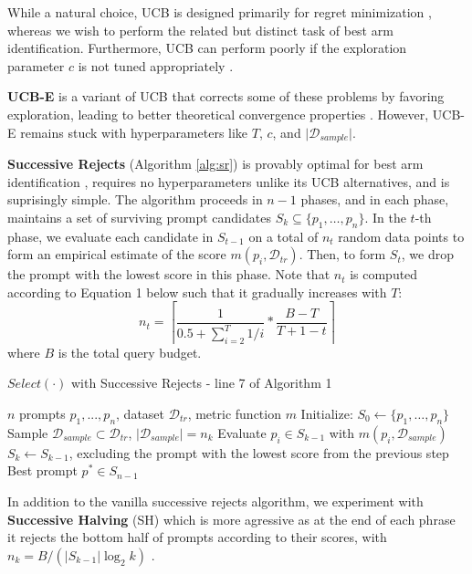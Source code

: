 While a natural choice, UCB is designed primarily for regret minimization \cite{kuleshov2014algorithms}, whereas we wish to perform the related but distinct task of best arm identification. Furthermore, UCB can perform poorly if the exploration parameter $c$ is not tuned appropriately \cite{bubeck2012regret}. 

\textbf{UCB-E} is a variant of UCB that corrects some of these problems by favoring exploration, leading to better theoretical convergence properties \cite{audibert2010best}. However, UCB-E remains stuck with hyperparameters like $T$, $c$, and $\vert \mathcal{D}_{sample}\vert$.

\textbf{Successive Rejects} (Algorithm \ref{alg:sr}) is provably optimal for best arm identification \citep{audibert2010best}, requires no hyperparameters unlike its UCB alternatives, and is suprisingly simple. The algorithm proceeds in $n - 1$ phases, and in each phase, maintains a set of surviving prompt candidates $S_k \subseteq \{p_1, \ldots, p_n\}$.
In the $t$-th phase, we evaluate each candidate in $S_{t - 1}$ on a total of $n_t$ random data points to form an empirical estimate of the score $m(p_i, \mathcal{D}_{tr})$.
Then, to form $S_t$, we drop the prompt with the lowest score in this phase.
Note that $n_t$ is computed according to Equation 1 below such that it gradually increases with $T$:
\begin{equation}
    n_t = \left \lceil{\frac{1}{0.5 + \sum_{i=2}^{T} 1 / i} * \frac{B - T}{T + 1 - t}}\right \rceil 
\end{equation}
where $B$ is the total query budget.

\begin{algorithm}
\caption{$Select(\cdot)$ with Successive Rejects - line 7 of Algorithm 1}
\label{alg:sr}
\begin{algorithmic}[1]
\REQUIRE $n$ prompts $p_1, ..., p_n$, dataset $\mathcal{D}_{tr}$, metric function $m$
\STATE Initialize: $S_0 \gets \{p_1, \ldots, p_n\}$
    \STATE Sample $\mathcal{D}_{sample} \subset \mathcal{D}_{tr}$, $\vert \mathcal{D}_{sample}\vert = n_k$ 
    \STATE Evaluate $p_i \in S_{k - 1}$ with $m(p_i, \mathcal{D}_{sample})$
    \STATE $S_k \gets S_{k - 1}$, excluding the prompt with the lowest score from the previous step
\ENDFOR
\RETURN Best prompt $p^* \in S_{n - 1}$
\end{algorithmic}
\end{algorithm}

In addition to the vanilla successive rejects algorithm, we experiment with \textbf{Successive Halving} (SH) which is more agressive as at the end of each phrase it rejects the bottom half of prompts according to their scores, with $n_k = B / (\vert S_{k-1} \vert \log_2 k)$ \cite{karnin2013almost}.  

